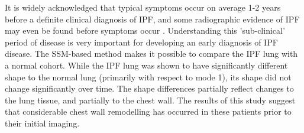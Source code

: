 It is widely acknowledged that typical symptoms occur on average 1-2 years before a definite clinical diagnosis of IPF, and some radiographic evidence of IPF may even be found before symptoms occur \citep{raghu2011official, devaraj2014imaging}. Understanding this 'sub-clinical' period of disease is very important for developing an early diagnosis of IPF disease. The SSM-based method makes it possible to compare the IPF lung with a normal cohort. While the IPF lung was shown to have significantly different shape to the normal lung (primarily with respect to mode 1), its shape did not change significantly over time. The shape differences partially reflect changes to the lung tissue, and partially to the chest wall. The results of this study suggest that considerable chest wall remodelling has occurred in these patients prior to their initial imaging. 


